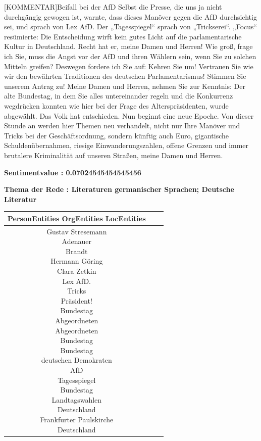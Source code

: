 \documentclass[a4paper,11pt]{article}
\begin{document}
[KOMMENTAR]Beifall bei der AfD
 Selbst die Presse, die uns ja nicht durchgängig gewogen ist, warnte, dass dieses Manöver gegen die AfD durchsichtig sei, und sprach von Lex AfD. Der „Tagesspiegel“ sprach von „Trickserei“. „Focus“ resümierte: Die Entscheidung wirft kein gutes Licht auf die parlamentarische Kultur in Deutschland. Recht hat er, meine Damen und Herren! Wie groß, frage ich Sie, muss die Angst vor der AfD und ihren Wählern sein, wenn Sie zu solchen Mitteln greifen? Deswegen fordere ich Sie auf: Kehren Sie um! Vertrauen Sie wie wir den bewährten Traditionen des deutschen Parlamentarismus! Stimmen Sie unserem Antrag zu! Meine Damen und Herren, nehmen Sie zur Kenntnis: Der alte Bundestag, in dem Sie alles untereinander regeln und die Konkurrenz wegdrücken konnten wie hier bei der Frage des Alterspräsidenten, wurde abgewählt. Das Volk hat entschieden. Nun beginnt eine neue Epoche. Von dieser Stunde an werden hier Themen neu verhandelt, nicht nur Ihre Manöver und Tricks bei der Geschäftsordnung, sondern künftig auch Euro, gigantische Schuldenübernahmen, riesige Einwanderungszahlen, offene Grenzen und immer brutalere Kriminalität auf unseren Straßen, meine Damen und Herren.

\textbf{Sentimentvalue : 0.07024545454545456}

\textbf{Thema der Rede : Literaturen germanischer Sprachen; Deutsche Literatur}
\vspace*{1cm}

\begin{table}[ht]
\centering
\begin{tabular}{||c | c | c||}
\hline
PersonEntities  OrgEntities  LocEntities \\ 

\hline\hline
\makecell{Gustav Stresemann \\
Adenauer \\
Brandt \\
Hermann Göring \\
Clara Zetkin \\
Lex AfD. \\
Tricks \\
} 
\makecell{Präsident! \\
Bundestag \\
Abgeordneten \\
Abgeordneten \\
Bundestag \\
Bundestag \\
deutschen Demokraten \\
AfD \\
Tagesspiegel \\
Bundestag \\
} 
\makecell{Landtagswahlen \\
Deutschland \\
Frankfurter Paulskirche \\
Deutschland \\
}\\
\hline
\end{tabular}
\end{table}
\clearpage
\end{document}
